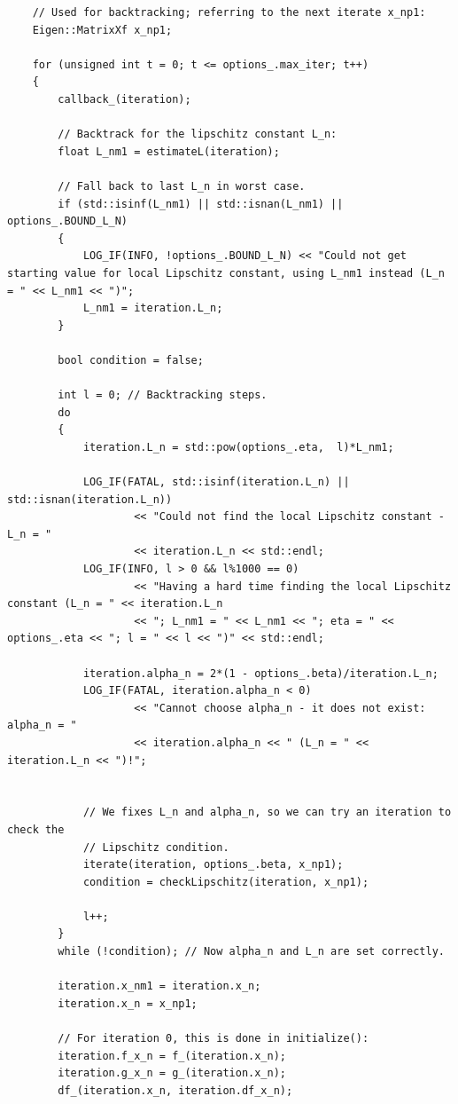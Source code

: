 \documentclass[onecolumn,final,a4paper,13pt,reqno]{siamart}
\begin{document}
\begin{appendix}
\begin{lstlisting}
    // Used for backtracking; referring to the next iterate x_np1:
    Eigen::MatrixXf x_np1;
    
    for (unsigned int t = 0; t <= options_.max_iter; t++)
    {
        callback_(iteration);
        
        // Backtrack for the lipschitz constant L_n:
        float L_nm1 = estimateL(iteration);
        
        // Fall back to last L_n in worst case.
        if (std::isinf(L_nm1) || std::isnan(L_nm1) || options_.BOUND_L_N)
        {
            LOG_IF(INFO, !options_.BOUND_L_N) << "Could not get starting value for local Lipschitz constant, using L_nm1 instead (L_n = " << L_nm1 << ")";
            L_nm1 = iteration.L_n;
        }
        
        bool condition = false;
        
        int l = 0; // Backtracking steps.
        do
        {
            iteration.L_n = std::pow(options_.eta,  l)*L_nm1;
            
            LOG_IF(FATAL, std::isinf(iteration.L_n) || std::isnan(iteration.L_n)) 
                    << "Could not find the local Lipschitz constant - L_n = " 
                    << iteration.L_n << std::endl;
            LOG_IF(INFO, l > 0 && l%1000 == 0) 
                    << "Having a hard time finding the local Lipschitz constant (L_n = " << iteration.L_n 
                    << "; L_nm1 = " << L_nm1 << "; eta = " << options_.eta << "; l = " << l << ")" << std::endl;
            
            iteration.alpha_n = 2*(1 - options_.beta)/iteration.L_n;
            LOG_IF(FATAL, iteration.alpha_n < 0)
                    << "Cannot choose alpha_n - it does not exist: alpha_n = " 
                    << iteration.alpha_n << " (L_n = " << iteration.L_n << ")!";
            
            
            // We fixes L_n and alpha_n, so we can try an iteration to check the
            // Lipschitz condition.
            iterate(iteration, options_.beta, x_np1);
            condition = checkLipschitz(iteration, x_np1);
            
            l++;
        }
        while (!condition); // Now alpha_n and L_n are set correctly.
        
        iteration.x_nm1 = iteration.x_n;
        iteration.x_n = x_np1;
        
        // For iteration 0, this is done in initialize():
        iteration.f_x_n = f_(iteration.x_n);
        iteration.g_x_n = g_(iteration.x_n);
        df_(iteration.x_n, iteration.df_x_n);
        

\end{lstlisting}
\end{appendix}
\end{document}
